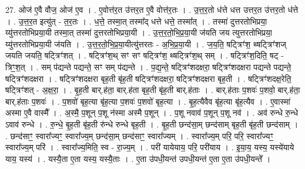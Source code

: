 \documentclass[17pt]{extarticle}
\begin{document}
27. ओज॑ ए॒वै वौज॒ ओज॑ ए॒व । . ए॒वोत्त॑र॒त उ॑त्तर॒त ए॒वै वोत्त॑र॒तः । . उ॒त्त॒र॒तो ध॑त्ते धत्त उत्तर॒त उ॑त्तर॒तो ध॑त्ते । . उ॒त्त॒र॒त इत्यु॑त् - त॒र॒तः । . ध॒त्ते॒ तस्मा॒त् तस्मा᳚द् धत्ते धत्ते॒ तस्मा᳚त् । . तस्मा॑ दुत्तरतोभिप्रया॒ य्यु॑त्तरतोभिप्रया॒यी तस्मा॒त् तस्मा॑ दुत्तरतोभिप्रया॒यी । . उ॒त्त॒र॒तो॒भि॒प्र॒या॒यी ज॑यति जय त्युत्तरतोभिप्रया॒ य्यु॑त्तरतोभिप्रया॒यी ज॑यति । . उ॒त्त॒र॒तो॒भि॒प्र॒या॒यीत्यु॑त्तरतः - अ॒भि॒प्र॒या॒यी । . ज॒य॒ति॒ षट्त्रिꣳ॑श॒ थ्षट्त्रिꣳ॑शज् जयति जयति॒ षट्त्रिꣳ॑शत् । . षट्त्रिꣳ॑श॒थ् सꣳ सꣳ षट्त्रिꣳ॑श॒ थ्षट्त्रिꣳ॑श॒थ् सम् । . षट्त्रिꣳ॑श॒दिति॒ षट् - त्रिꣳ॒॒श॒त् । . सम् प॑द्यन्ते पद्यन्ते॒ सꣳ सम् प॑द्यन्ते । . प॒द्य॒न्ते॒ षट्त्रिꣳ॑शदक्षरा॒ षट्त्रिꣳ॑शदक्षरा पद्यन्ते पद्यन्ते॒ षट्त्रिꣳ॑शदक्षरा । . षट्त्रिꣳ॑शदक्षरा बृह॒ती बृ॑ह॒ती षट्त्रिꣳ॑शदक्षरा॒ षट्त्रिꣳ॑शदक्षरा बृह॒ती । . षट्त्रिꣳ॑शदक्ष॒रेति॒ षट्त्रिꣳ॑शत् - अ॒क्ष॒रा॒ । . बृ॒ह॒ती बार्.ह॑ता॒ बार्.ह॑ता बृह॒ती बृ॑ह॒ती बार्.ह॑ताः । . बार्.ह॑ताः प॒शवः॑ प॒शवो॒ बार्.ह॑ता॒ बार्.ह॑ताः प॒शवः॑ । . प॒शवो॑ बृह॒त्या बृ॑ह॒त्या प॒शवः॑ प॒शवो॑ बृह॒त्या । . बृ॒ह॒त्यैवैव बृ॑ह॒त्या बृ॑ह॒त्यैव । . ए॒वास्मा॑ अस्मा ए॒वै वास्मै᳚ । . अ॒स्मै॒ प॒शून् प॒शू न॑स्मा अस्मै प॒शून् । . प॒शू नवाव॑ प॒शून् प॒शू नव॑ । . अव॑ रुन्धे रु॒न्धे ऽवाव॑ रुन्धे । . रु॒न्धे॒ बृ॒ह॒ती बृ॑ह॒ती रु॑न्धे रुन्धे बृह॒ती । . बृ॒ह॒ती छन्द॑सा॒म् छन्द॑साम् बृह॒ती बृ॑ह॒ती छन्द॑साम् । . छन्द॑साꣳ॒॒ स्वारा᳚ज्यꣳ॒॒ स्वारा᳚ज्य॒म् छन्द॑सा॒म् छन्द॑साꣳ॒॒ स्वारा᳚ज्यम् । . स्वारा᳚ज्य॒म् परि॒ परि॒ स्वारा᳚ज्यꣳ॒॒ स्वारा᳚ज्य॒म् परि॑ । . स्वारा᳚ज्य॒मिति॒ स्व - रा॒ज्य॒म् । . परी॑ यायेयाय॒ परि॒ परी॑याय । . इ॒या॒य॒ यस्य॒ यस्ये॑याये याय॒ यस्य॑ । . यस्यै॒ता ए॒ता यस्य॒ यस्यै॒ताः । . ए॒ता उ॑पधी॒यन्त॑ उपधी॒यन्त॑ ए॒ता ए॒ता उ॑पधी॒यन्ते᳚ । \newline
\end{document}
